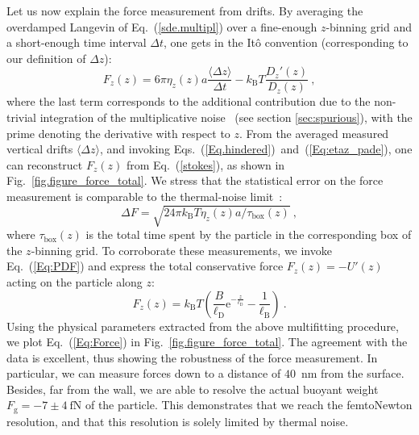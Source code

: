 Let us now explain the force measurement from drifts. By averaging the overdamped Langevin of Eq.~(\ref{sde.multipl}) over a fine-enough $z$-binning grid and a short-enough time interval $\Delta t$, one gets in the Itô convention (corresponding to our definition of $\Delta z$):
\begin{equation}
	F_z (z) = 6 \pi \eta_z (z ) a \frac{\langle\Delta z\rangle}{\Delta t} - k_\mathrm{B}T \frac{D_z'(z)}{D_z(z)} \ ,
	\label{stokes}
\end{equation}
where the last term corresponds to the additional contribution due to the non-trivial integration of the multiplicative noise~\cite{volpe_influence_2010,mannella_comment_2011,mannella_ito_2012, sancho_brownian_2011} (see section \ref{sec:spurious}), with the prime denoting the derivative with respect to $z$. From the averaged measured vertical drifts $\langle\Delta z\rangle$, and invoking Eqs.~(\ref{Eq.hindered})~and~(\ref{Eq:etaz_pade}), one can reconstruct $F_z(z)$ from Eq.~(\ref{stokes}), as shown in Fig.~\ref{fig.figure_force_total}. We stress that the statistical error on the force measurement is comparable to the thermal-noise limit~\cite{liu_subfemtonewton_2016}: 
\begin{equation}
	\label{tnl}
	\Delta F=\sqrt{24\pi k_{\mathrm{B}}T \eta_z(z) a/ \tau_{\textrm{box}}(z)}\ ,
\end{equation}
where $\tau_{\textrm{box}}(z)$ is the total time spent by the particle in the corresponding box of the $z$-binning grid. To corroborate these measurements, we invoke Eq.~(\ref{Eq:PDF}) and express the total conservative force $F_z(z)=-U'(z)$ acting on the particle along $z$:
\begin{equation}
	\displaystyle F_z(z) =  k_{\mathrm{B}}T\left(\frac{B}{\ell_\mathrm{D}} \textrm{e}^{-\frac{z}{\ell_\mathrm{D}}} - \frac{1}{\ell_\mathrm{B}}\right)\ .
	\label{Eq:Force}
\end{equation} 
Using the physical parameters extracted from the above multifitting procedure, we plot Eq.~(\ref{Eq:Force}) in Fig.~\ref{fig.figure_force_total}. The agreement with the data is excellent, thus showing the robustness of the force measurement. In particular, we can measure forces down to a distance of $40$~nm from the surface. Besides, far from the wall, we are able to resolve the actual buoyant weight $F_{\textrm{g}} =- 7  \pm 4 ~ \mathrm{fN}$ of the particle. This demonstrates that we reach the femtoNewton resolution, and that this resolution is solely limited by thermal noise.
